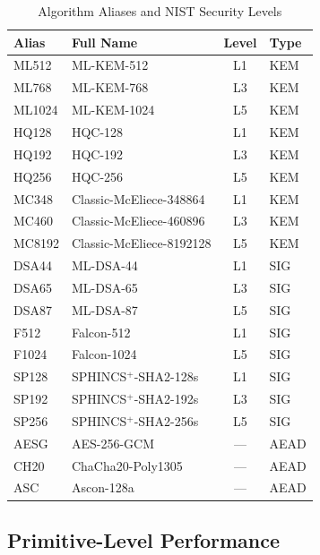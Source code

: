 \begin{table}[t]
\centering
\caption{Algorithm Aliases and NIST Security Levels}
\label{tab:aliases}
\footnotesize
\begin{tabular}{@{}llcl@{}}
\toprule
\textbf{Alias} & \textbf{Full Name} & \textbf{Level} & \textbf{Type} \\
\midrule
ML512  & ML-KEM-512                & L1 & KEM  \\
ML768  & ML-KEM-768                & L3 & KEM  \\
ML1024 & ML-KEM-1024               & L5 & KEM  \\
HQ128  & HQC-128                   & L1 & KEM  \\
HQ192  & HQC-192                   & L3 & KEM  \\
HQ256  & HQC-256                   & L5 & KEM  \\
MC348  & Classic-McEliece-348864   & L1 & KEM  \\
MC460  & Classic-McEliece-460896   & L3 & KEM  \\
MC8192 & Classic-McEliece-8192128  & L5 & KEM  \\
\midrule
DSA44  & ML-DSA-44                 & L1 & SIG  \\
DSA65  & ML-DSA-65                 & L3 & SIG  \\
DSA87  & ML-DSA-87                 & L5 & SIG  \\
F512   & Falcon-512                & L1 & SIG  \\
F1024  & Falcon-1024               & L5 & SIG  \\
SP128  & SPHINCS$^+$-SHA2-128s     & L1 & SIG  \\
SP192  & SPHINCS$^+$-SHA2-192s     & L3 & SIG  \\
SP256  & SPHINCS$^+$-SHA2-256s     & L5 & SIG  \\
\midrule
AESG   & AES-256-GCM               & ---& AEAD \\
CH20   & ChaCha20-Poly1305         & ---& AEAD \\
ASC    & Ascon-128a                & ---& AEAD \\
\bottomrule
\end{tabular}
\end{table}

\subsection{Primitive-Level Performance}
\label{sec:primitive}

